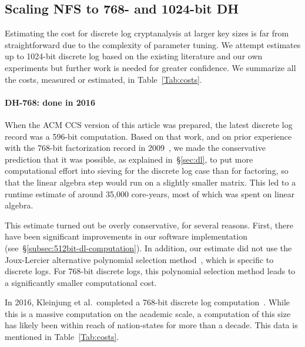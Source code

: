 \subsection{Scaling NFS to 768- and 1024-bit DH}

Estimating the cost for discrete log cryptanalysis at larger key sizes
is far from straightforward due to the complexity of
parameter tuning.
We attempt
estimates up to 1024-bit discrete log based on the existing
literature and our own experiments but further work is needed for
greater confidence.  We
summarize all the costs, measured or estimated, in
Table~\ref{Tab:costs}.

\paragraph{DH-768: done in 2016}
When the ACM CCS version of this article was prepared, the latest
discrete log record was a 596-bit computation. Based on that work, and on
prior experience with the 768-bit factorization record in
2009~\cite{rsa768}, we made the conservative prediction that it was
possible, as explained in~\S\ref{sec:dl}, to put more computational
effort into sieving for the discrete log case than for factoring, so that the
linear algebra step would run on a slightly smaller matrix. This led to a
runtime estimate of around 35,000 core-years, most of which was
spent on linear algebra.

This estimate turned out be overly conservative, for several reasons.
First, there have been significant improvements in our software implementation
(see~\S\ref{subsec:512bit-dl-computation}). In addition, our estimate did not
use the Joux-Lercier alternative
polynomial selection method~\cite[\S2.1]{JL}, which is specific to discrete
logs.  For 768-bit discrete logs,
this polynomial selection method leads to a significantly smaller
computational cost.

In 2016, Kleinjung et al.\ completed a 768-bit discrete
log computation~\cite{Kleinjung2017}. While this is a massive
computation on the academic scale, a computation
of this size has likely been within reach of nation-states for more than a decade. This
data is mentioned in Table~\ref{Tab:costs}.


